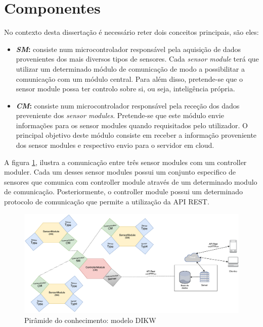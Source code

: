 \section{Componentes}

No contexto desta dissertação é necessário reter dois conceitos principais, são eles: 

\begin{itemize}
	\item \textbf{\textit{\ac{SM}}:} consiste num microcontrolador responsável pela aquisição de dados provenientes dos mais diversos tipos de sensores. Cada \textit{sensor module} terá que utilizar um determinado módulo de comunicação de modo a possibilitar a comunicação com um módulo central. Para além disso, pretende-se que o sensor module possa ter controlo sobre si, ou seja, inteligência própria.
	 
	\item \textbf{\textit{\ac{CM}}:} consiste num microcontrolador responsável pela receção dos dados preveniente dos \textit{sensor modules}. Pretende-se que este módulo envie informações para os sensor modules quando requisitados pelo utilizador. O principal objetivo deste módulo consiste em receber a informação proveniente dos sensor modules e respectivo envio para o servidor em cloud. 
	
	
\end{itemize}


A figura \ref{esquema1}, ilustra a comunicação entre três sensor modules com um controller moduler. Cada um desses sensor modules possui um conjunto especifico de sensores que comunica com controller module através de um determinado modulo de comunicação. Posteriormente, o controller module possui um determinado protocolo de comunicação que permite a utilização da API REST. 


\begin{figure}[h]
	\centering
	\includegraphics[scale=0.35]{esquemas/general-electronic-modules.pdf}
	\caption{Pirâmide do conhecimento: modelo DIKW}
	\label{esquema1}
\end{figure}


